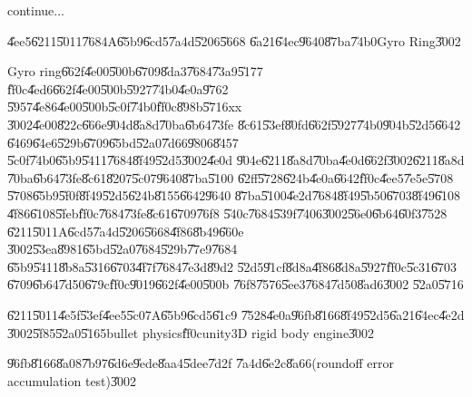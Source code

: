 continue...

\clearpage%

\begin{case}
\U{4ee5}\U{6211}\U{5011}\U{7684}A\U{65b9}\U{6cd5}\U{7a4d}\U{5206}\U{5668}%
\U{6a21}\U{64ec}\U{9640}\U{87ba}\U{74b0}Gyro Ring\U{3002}
\end{case}

Gyro ring\U{662f}\U{4e00}\U{500b}\U{6709}\U{8da3}\U{7684}\U{73a9}\U{5177}%
\U{ff0c}\U{4ed6}\U{662f}\U{4e00}\U{500b}\U{5927}\U{74b0}\U{4e0a}\U{9762}%
\U{5957}\U{4e86}\U{4e00}\U{500b}\U{5c0f}\U{74b0}\U{ff0c}\U{898b}\U{5716}xx%
\U{3002}\U{4e00}\U{822c}\U{666e}\U{904d}\U{8a8d}\U{70ba}\U{6b64}\U{73fe}%
\U{8c61}\U{53ef}\U{80fd}\U{662f}\U{5927}\U{74b0}\U{904b}\U{52d5}\U{6642}%
\U{6469}\U{64e6}\U{529b}\U{6709}\U{65bd}\U{52a0}\U{7d66}\U{9806}\U{8457}%
\U{5c0f}\U{74b0}\U{65b9}\U{5411}\U{7684}\U{8f49}\U{52d5}\U{3002}\U{4e0d}%
\U{904e}\U{6211}\U{8a8d}\U{70ba}\U{4e0d}\U{662f}\U{3002}\U{6211}\U{8a8d}%
\U{70ba}\U{6b64}\U{73fe}\U{8c61}\U{8207}\U{5c07}\U{9640}\U{87ba}\U{5100}%
\U{62ff}\U{5728}\U{624b}\U{4e0a}\U{6642}\U{ff0c}\U{4ee5}\U{7e5e}\U{5708}%
\U{5708}\U{65b9}\U{5f0f}\U{8f49}\U{52d5}\U{624b}\U{8155}\U{6642}\U{9640}%
\U{87ba}\U{5100}\U{4e2d}\U{7684}\U{8f49}\U{5b50}\U{6703}\U{8f49}\U{6108}%
\U{4f86}\U{6108}\U{5feb}\U{ff0c}\U{7684}\U{73fe}\U{8c61}\U{6709}\U{76f8}%
\U{540c}\U{7684}\U{539f}\U{7406}\U{3002}\U{56e0}\U{6b64}\U{60f3}\U{7528}%
\U{6211}\U{5011}A\U{6cd5}\U{7a4d}\U{5206}\U{5668}\U{4f86}\U{8b49}\U{660e}%
\U{3002}\U{53ea}\U{8981}\U{65bd}\U{52a0}\U{7684}\U{529b}\U{77e9}\U{7684}%
\U{65b9}\U{5411}\U{8b8a}\U{5316}\U{6703}\U{4f7f}\U{7684}\U{7e3d}\U{89d2}%
\U{52d5}\U{91cf}\U{8d8a}\U{4f86}\U{8d8a}\U{5927}\U{ff0c}\U{5c31}\U{6703}%
\U{6709}\U{6b64}\U{7d50}\U{679c}\U{ff0c}\U{9019}\U{662f}\U{4e00}\U{500b}%
\U{76f8}\U{7576}\U{5ee3}\U{7684}\U{7d50}\U{8ad6}\U{3002}\newline
\U{52a0}\U{5716}

\begin{case}
\U{6211}\U{5011}\U{4e5f}\U{53ef}\U{4ee5}\U{5c07}A\U{65b9}\U{6cd5}\U{61c9}%
\U{7528}\U{4e0a}\U{96fb}\U{8166}\U{8f49}\U{52d5}\U{6a21}\U{64ec}\U{4e2d}%
\U{3002}\U{5f85}\U{52a0}\U{5165}bullet physics\U{ff0c}unity3D rigid body
engine\U{3002}
\end{case}

\clearpage%

\begin{case}
\U{96fb}\U{8166}\U{8a08}\U{7b97}\U{6d6e}\U{9ede}\U{8aa4}\U{5dee}\U{7d2f}%
\U{7a4d}\U{6e2c}\U{8a66}(roundoff error accumulation test)\U{3002}
\end{case}

